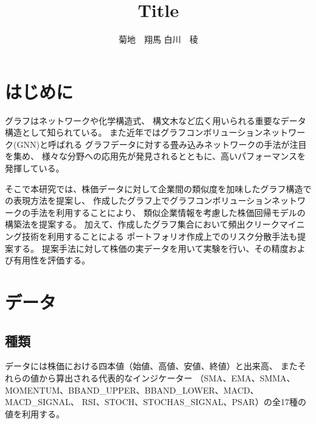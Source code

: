 \documentclass[twocolumn,10.5pt]{article}           %
\begin{document}
\title{Title}
\author{菊地　翔馬 \hspace{180pt} 白川　稜}

\date{}
\maketitle


\section{はじめに}
グラフはネットワークや化学構造式、
構文木など広く用いられる重要なデータ構造として知られている。
また近年ではグラフコンボリューションネットワーク(GNN)と呼ばれる
グラフデータに対する畳み込みネットワークの手法が注目を集め、
様々な分野への応用先が発見されるとともに、高いパフォーマンスを発揮している。

そこで本研究では、株価データに対して企業間の類似度を加味したグラフ構造での表現方法を提案し、
作成したグラフ上でグラフコンボリューションネットワークの手法を利用することにより、
類似企業情報を考慮した株価回帰モデルの構築法を提案する。
加えて、作成したグラフ集合において頻出クリークマイニング技術を利用することによる
ポートフォリオ作成上でのリスク分散手法も提案する。
提案手法に対して株価の実データを用いて実験を行い、その精度および有用性を評価する。

\section{データ}
\subsection{種類}
データには株価における四本値（始値、高値、安値、終値）と出来高、
またそれらの値から算出される代表的なインジケーター
（SMA、EMA、SMMA、MOMENTUM、BBAND\_UPPER、BBAND\_LOWER、MACD、MACD\_SIGNAL、
RSI、STOCH、STOCHAS\_SIGNAL、PSAR）の全17種の値を利用する。
\end{document}
